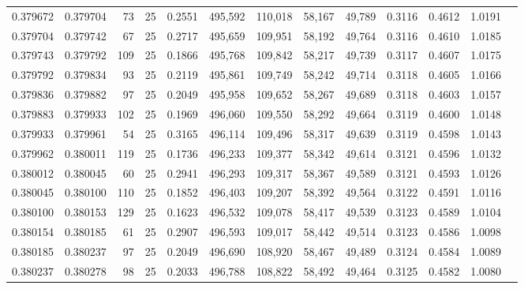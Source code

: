 \begin{tabular}{rrrrrrrrrrrrr}
0.379672 & 0.379704 &    73 &  25 &                                     0.2551 & 495,592 & 110,018 &  58,167 &  49,789 & 0.3116 & 0.4612 & 1.0191 \\
0.379704 & 0.379742 &    67 &  25 &                                     0.2717 & 495,659 & 109,951 &  58,192 &  49,764 & 0.3116 & 0.4610 & 1.0185 \\
0.379743 & 0.379792 &   109 &  25 &                                     0.1866 & 495,768 & 109,842 &  58,217 &  49,739 & 0.3117 & 0.4607 & 1.0175 \\
0.379792 & 0.379834 &    93 &  25 &                                     0.2119 & 495,861 & 109,749 &  58,242 &  49,714 & 0.3118 & 0.4605 & 1.0166 \\
0.379836 & 0.379882 &    97 &  25 &                                     0.2049 & 495,958 & 109,652 &  58,267 &  49,689 & 0.3118 & 0.4603 & 1.0157 \\
0.379883 & 0.379933 &   102 &  25 &                                     0.1969 & 496,060 & 109,550 &  58,292 &  49,664 & 0.3119 & 0.4600 & 1.0148 \\
0.379933 & 0.379961 &    54 &  25 &                                     0.3165 & 496,114 & 109,496 &  58,317 &  49,639 & 0.3119 & 0.4598 & 1.0143 \\
0.379962 & 0.380011 &   119 &  25 &                                     0.1736 & 496,233 & 109,377 &  58,342 &  49,614 & 0.3121 & 0.4596 & 1.0132 \\
0.380012 & 0.380045 &    60 &  25 &                                     0.2941 & 496,293 & 109,317 &  58,367 &  49,589 & 0.3121 & 0.4593 & 1.0126 \\
0.380045 & 0.380100 &   110 &  25 &                                     0.1852 & 496,403 & 109,207 &  58,392 &  49,564 & 0.3122 & 0.4591 & 1.0116 \\
0.380100 & 0.380153 &   129 &  25 &                                     0.1623 & 496,532 & 109,078 &  58,417 &  49,539 & 0.3123 & 0.4589 & 1.0104 \\
0.380154 & 0.380185 &    61 &  25 &                                     0.2907 & 496,593 & 109,017 &  58,442 &  49,514 & 0.3123 & 0.4586 & 1.0098 \\
0.380185 & 0.380237 &    97 &  25 &                                     0.2049 & 496,690 & 108,920 &  58,467 &  49,489 & 0.3124 & 0.4584 & 1.0089 \\
0.380237 & 0.380278 &    98 &  25 &                                     0.2033 & 496,788 & 108,822 &  58,492 &  49,464 & 0.3125 & 0.4582 & 1.0080 \\

\end{tabular}
